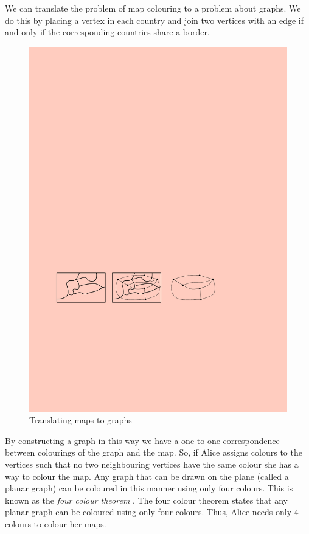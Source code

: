 We can translate the problem of map colouring to a problem about graphs. We do this by placing a vertex in each country and join two vertices with an edge if and only if the corresponding countries share a border. 
\begin{figure}[h]
    \centering
    \includegraphics[width=\textwidth]{images/161-fig38}
    \caption{Translating maps to graphs}
\end{figure}
By constructing a graph in this way we have a one to one correspondence between colourings of the graph and the map. So, if Alice assigns colours to the vertices such that no two neighbouring vertices have the same colour she has a way to colour the map. Any graph that can be drawn on the plane (called a planar graph) can be coloured in this manner using only four colours. This is known as the \textit{four colour theorem} \cite{thomas19984ColourUpdate}. The four colour theorem states that any planar graph can be coloured using only four colours. Thus, Alice needs only 4 colours to colour her maps.

